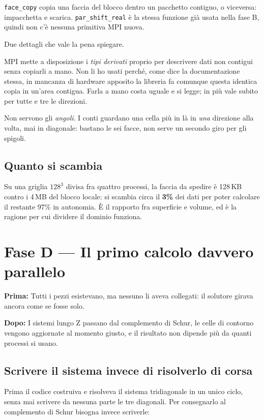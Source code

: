 \documentclass[11pt,a4paper]{article}
\newcommand{\prima}[1]{\par\smallskip\noindent\textbf{\color{scuro}Prima:} #1\par}
\newcommand{\dopo}[1]{\par\smallskip\noindent\textbf{\color{scuro}Dopo:} #1\par\smallskip}
\newcommand{\cd}[1]{\texttt{\small #1}}
\begin{document}
\cd{face\_copy} copia una faccia del blocco dentro un pacchetto contiguo, o
viceversa: impacchetta e scarica. \cd{par\_shift\_real} è la stessa funzione
già usata nella fase B, quindi non c'è nessuna primitiva MPI nuova.

Due dettagli che vale la pena spiegare.

MPI mette a disposizione i \emph{tipi derivati} proprio per descrivere dati non
contigui senza copiarli a mano. Non li ho usati perché, come dice la
documentazione stessa, in mancanza di hardware apposito la libreria fa
comunque questa identica copia in un'area contigua. Farla a mano costa uguale
e si legge; in più vale subito per tutte e tre le direzioni.

Non servono gli \emph{angoli}. I conti guardano una cella più in là in
\emph{una} direzione alla volta, mai in diagonale: bastano le sei facce, non
serve un secondo giro per gli spigoli.

\subsection*{Quanto si scambia}

Su una griglia $128^3$ divisa fra quattro processi, la faccia da spedire è
128\,KB contro i 4\,MB del blocco locale: si scambia circa il \textbf{3\%} dei
dati per poter calcolare il restante 97\% in autonomia. È il rapporto fra
superficie e volume, ed è la ragione per cui dividere il dominio funziona.

\section{Fase D --- Il primo calcolo davvero parallelo}

\prima{Tutti i pezzi esistevano, ma nessuno li aveva collegati: il solutore
girava ancora come se fosse solo.}

\dopo{I sistemi lungo Z passano dal complemento di Schur, le celle di contorno
vengono aggiornate al momento giusto, e il risultato non dipende più da quanti
processi si usano.}

\subsection*{Scrivere il sistema invece di risolverlo di corsa}

Prima il codice costruiva e risolveva il sistema tridiagonale in un unico
ciclo, senza mai scrivere da nessuna parte le tre diagonali. Per consegnarlo
al complemento di Schur bisogna invece scriverle:
\end{document}
